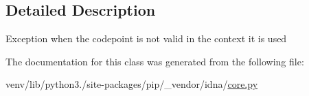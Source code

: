 \subsection{Detailed Description}
\begin{DoxyVerb}Exception when the codepoint is not valid in the context it is used \end{DoxyVerb}
 

The documentation for this class was generated from the following file\+:\begin{DoxyCompactItemize}
\item 
venv/lib/python3./site-\/packages/pip/\+\_\+vendor/idna/\hyperlink{pip_2__vendor_2idna_2core_8py}{core.\+py}\end{DoxyCompactItemize}
